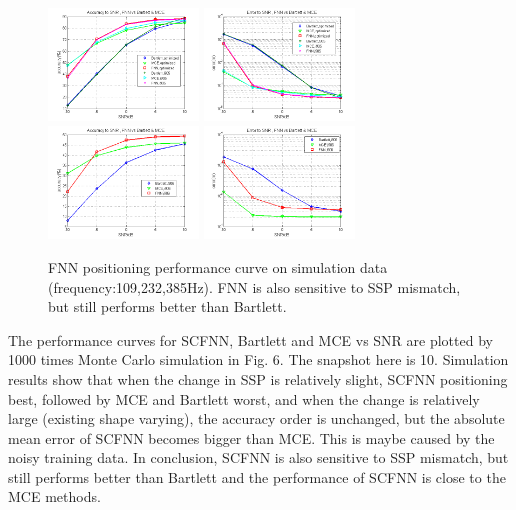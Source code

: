 \begin{figure}
\includegraphics[width=4cm,height=3cm]{figure/Accuracy_to_SNR_FNN_vs_Bartlett_MCE}
\includegraphics[width=4cm,height=3cm]{figure/Error_to_SNR_FNN_vs_Bartlett_MCE}
\includegraphics[width=4cm,height=3cm]{figure/Accuracy_to_SNR_FNN_vs_Bartlett_MCE_i906}
\includegraphics[width=4cm,height=3cm]{figure/Error_to_SNR_FNN_vs_Bartlett_MCE_i906}
\caption{FNN positioning performance curve on simulation data (frequency:109,232,385Hz).
 FNN is also sensitive to SSP mismatch, but still performs better than Bartlett.
}
\end{figure}
The performance curves for SCFNN, Bartlett and MCE vs SNR are plotted by 1000 times Monte Carlo simulation in Fig. 6. The snapshot here is 10.
Simulation results show that when the change in SSP is relatively slight, SCFNN positioning best, followed by MCE and Bartlett worst, and when the change is relatively large (existing shape varying), the accuracy order is unchanged, but the absolute mean error of SCFNN becomes bigger than MCE.
This is maybe caused by the noisy training data.
In conclusion, SCFNN is also sensitive to SSP mismatch, but still performs better than Bartlett and the performance of SCFNN is close to the MCE methods.
